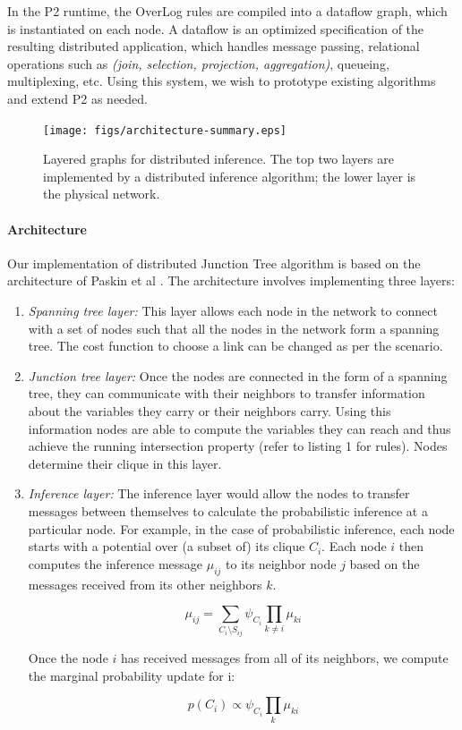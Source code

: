 In the P2 runtime, the OverLog rules are compiled into a dataflow graph, which
is instantiated on each node. A dataflow is an optimized specification of the
resulting distributed application, which handles message passing, relational
operations such as \emph{(join, selection, projection, aggregation)},
queueing, multiplexing, etc. Using this system, we wish to prototype existing
algorithms and extend P2 as needed.

\begin{figure}[htpb]
 \centering
 \epsfxsize=1in
 \texttt{[image: figs/architecture-summary.eps]}
 \caption{Layered graphs for distributed inference. The top two layers are implemented by a distributed inference algorithm; the lower layer is the physical network.}
 \label{fig:architecture}
\end{figure}

\paragraph{Architecture} Our implementation of distributed Junction Tree
algorithm is based on the architecture of Paskin et al \cite{ipsn}. The
architecture involves implementing three layers:

\begin{enumerate}

\item {\textit{Spanning tree layer:}} This layer allows each node in the
network to connect with a set of nodes such that all the nodes in the network
form a spanning tree. The cost function to choose a link can be changed as per
the scenario.

\item{\textit{Junction tree layer:}} Once the nodes are connected in the form
of a spanning tree, they can communicate with their neighbors to transfer
information about the variables they carry or their neighbors carry. Using
this information nodes are able to compute the variables they can reach and
thus achieve the running intersection property (refer to listing 1 for rules).
Nodes determine their clique in this layer.

\item{\textit{Inference layer:}} The inference layer would allow the nodes to
transfer messages between themselves to calculate the probabilistic inference
at a particular node. For example, in the case of probabilistic inference,
each node starts with a potential over (a subset of) its clique $C_i$. Each
node $i$ then computes the inference message $\mu_{ij}$ to its neighbor node
$j$ based on the messages received from its other neighbors $k$.

\[
\mu_{ij} = \sum_{C_i \setminus S_{ij}} \psi_{C_i} \prod_{k \neq i} \mu_{ki}
\]

Once the node $i$ has received messages from all of its neighbors, we compute
the marginal probability update for i:

\[
p(C_i) \propto \psi_{C_i} \prod_{k} \mu_{ki}
\]

\end{enumerate}	

